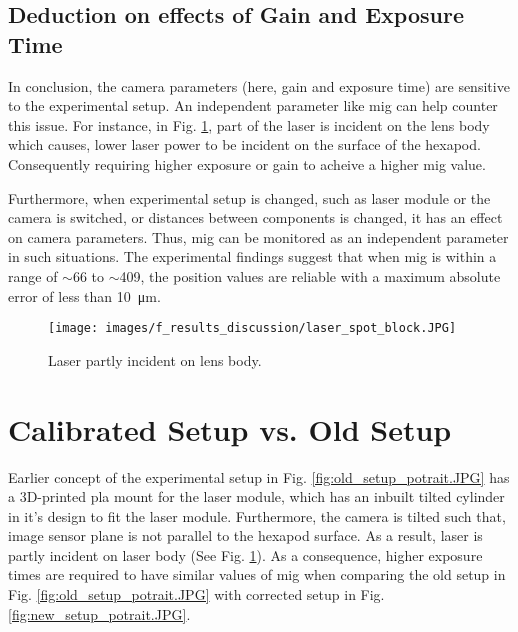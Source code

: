 \clearpage

\subsection*{Deduction on effects of Gain and Exposure Time}
\noindent In conclusion, the camera parameters (here, gain and exposure time) are sensitive to the experimental setup. An independent parameter like \gls{mig} can help counter this issue. For instance, in Fig. \ref{fig:laser_spot_block.JPG}, part of the laser is incident on the lens body which causes, lower laser power to be incident on the surface of the hexapod. Consequently requiring higher exposure or gain to acheive a higher \gls{mig} value. 

\vspace{5mm}
\noindent Furthermore, when experimental setup is changed, such as laser module or the camera is switched, or distances between components is changed, it has an effect on camera parameters. Thus, \gls{mig} can be monitored as an independent parameter in such situations. The experimental findings suggest that when \gls{mig} is within a range of $\sim$66 to $\sim$409, the position values are reliable with a maximum absolute error of less than \SI{10}{\micro\meter}.

\vspace{5mm}

\begin{figure}[h]
    \centering
    \texttt{[image: images/f\_results\_discussion/laser\_spot\_block.JPG]}
    \caption{Laser partly incident on lens body.}
    \label{fig:laser_spot_block.JPG}
\end{figure}

\section{Calibrated Setup vs. Old Setup}
Earlier concept of the experimental setup in Fig. \ref{fig:old_setup_potrait.JPG} has a 3D-printed \gls{pla} mount for the laser module, which has an inbuilt tilted cylinder in it's design to fit the laser module. Furthermore, the camera is tilted such that, image sensor plane is not parallel to the hexapod surface. As a result, laser is partly incident on laser body (See Fig. \ref{fig:laser_spot_block.JPG}). As a consequence, higher exposure times are required to have similar values of \gls{mig} when comparing the old setup in Fig. \ref{fig:old_setup_potrait.JPG} with corrected setup in Fig. \ref{fig:new_setup_potrait.JPG}.

